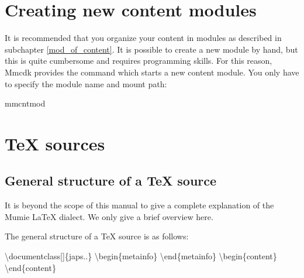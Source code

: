 \documentclass{generic}
\newcommand{\texcmd}[1]{\backslash#1}
\begin{document}
\begin{description}
\item[]

\item[]

\item[]

\item[]

\item[]

\item[]


\end{description}

\section{Creating new content modules}

It is recommended that you organize your content in modules as described in subchapter
\ref{mod_of_content}. It is possible to create a new module by hand, but this is quite
cumbersome and requires programming skills. For this reason, Mmcdk provides the
 command which starts a new content module. You only have to specify the
module name and mount path: 

\begin{preformatted}mmcntmod   \end{preformatted}


\section{TeX sources}\label{tex_sources}

\subsection{General structure of a TeX source}\label{tex_sources_gen_struc}

It is beyond the scope of this manual to give a complete explanation of the
Mumie LaTeX dialect. We only give a brief overview here.

The general structure of a TeX source is as follows:

\begin{preformatted}%
\texcmd{documentclass}[]\{japs..\}
\texcmd{begin}\{metainfo\}
\texcmd{end}\{metainfo\}
\texcmd{begin}\{content\}
\texcmd{end}\{content\}
\end{preformatted}
\end{document}
